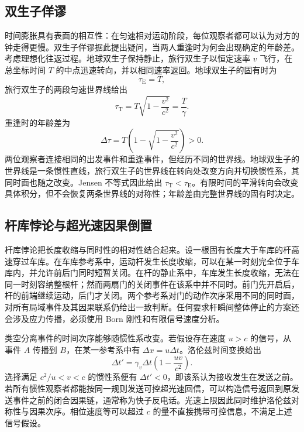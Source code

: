 \documentclass[style=classic,color=full]{lc-article}
\begin{document}
\subsection{双生子佯谬}

时间膨胀具有表面的相互性：在匀速相对运动阶段，每位观察者都可以认为对方的钟走得更慢。双生子佯谬据此提出疑问，当两人重逢时为何会出现确定的年龄差。考虑理想化往返过程。地球双生子保持静止，旅行双生子以恒定速率 $v$ 飞行，在总坐标时间 $T$ 的中点迅速转向，并以相同速率返回。地球双生子的固有时为
\begin{equation}
  \tau_{\mathrm E}=T,
\end{equation}
旅行双生子的两段匀速世界线给出
\begin{equation}
  \tau_{\mathrm T}
  =T\sqrt{1-\frac{v^2}{c^2}}
  =\frac{T}{\gamma}.
  \label{eq:twinpropertime}
\end{equation}
重逢时的年龄差为
\begin{equation}
  \Delta\tau
  =T\left(1-\sqrt{1-\frac{v^2}{c^2}}\right)>0.
\end{equation}
两位观察者连接相同的出发事件和重逢事件，但经历不同的世界线。地球双生子的世界线是一条惯性直线，旅行双生子的世界线在转向处改变方向并切换惯性系，其同时面也随之改变。Jensen 不等式因此给出 $\tau_{\mathrm T}<\tau_{\mathrm E}$。有限时间的平滑转向会改变具体积分，但不会恢复两条世界线的对称性；年龄差由完整世界线的固有时决定。


\subsection{杆库悖论与超光速因果倒置}

杆库悖论把长度收缩与同时性的相对性结合起来。设一根固有长度大于车库的杆高速穿过车库。在车库参考系中，运动杆发生长度收缩，可以在某一时刻完全位于车库内，并允许前后门同时短暂关闭。在杆的静止系中，车库发生长度收缩，无法在同一时刻容纳整根杆；然而两扇门的关闭事件在该系中并不同时。前门先开启后，杆的前端继续运动，后门才关闭。两个参考系对门的动作次序采用不同的同时面，对所有局域事件及其因果联系仍给出一致判断。任何要求杆瞬间整体停止的方案还会涉及应力传播，必须使用 Born 刚性和有限信号速度分析。

类空分离事件的时间次序能够随惯性系改变。若假设存在速度 $u>c$ 的信号，从事件 $A$ 传播到 $B$，在某一参考系中有 $\Delta x=u\Delta t$。洛伦兹时间变换给出
\begin{equation}
  \Delta t'
  =\gamma_v\Delta t
  \left(1-\frac{uv}{c^2}\right).
  \label{eq:superluminaltimeorder}
\end{equation}
选择满足 $c^2/u<v<c$ 的惯性系便有 $\Delta t'<0$，即该系认为接收发生在发送之前。若所有惯性观察者都能按同一规则发送可控超光速回信，可以构造信号返回到原发送事件之前的闭合因果链，通常称为快子反电话。光速上限因此同时维护洛伦兹对称性与因果次序。相位速度等可以超过 $c$ 的量不直接携带可控信息，不满足上述信号假设\cite{rindler,taylorwheeler}。
\end{document}
